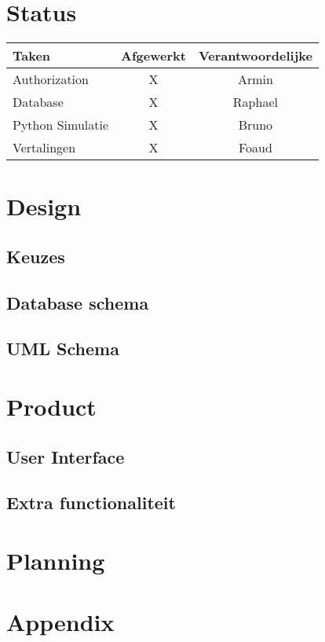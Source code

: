 \documentclass[12pt]{article}
\begin{document}
\maketitle

\section{Status}
\begin{tabular}{| l | c | c |}
    \hline
    Taken   &   Afgewerkt   &   Verantwoordelijke \\
    \hline \hline
    Authorization           &   X   &   Armin \\
    Database                &   X   &   Raphael \\
    Python Simulatie        &   X   &   Bruno \\
    Vertalingen             &   X   &   Foaud \\
    \hline
\end{tabular}

\section{Design}
\subsection{Keuzes}
\subsection{Database schema}
\subsection{UML Schema}

\section{Product}
\subsection{User Interface}
\subsection{Extra functionaliteit}

\section{Planning}
\section{Appendix}
\end{document}
